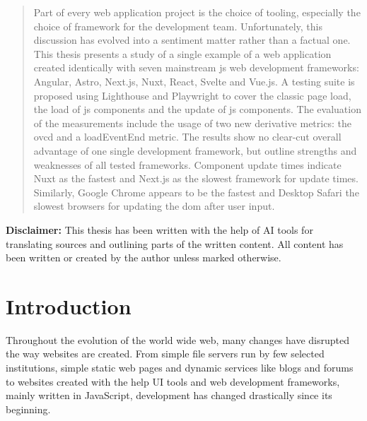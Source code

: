 \documentclass[a4paper, 12pt]{article}
\providecommand{\keywords}[1]
{
  {
    \footnotesize
    \textit{\textbf{Keywords ---} #1}
  } 
}
\begin{document}
\begin{abstract}
  Part of every web application project is the choice of tooling, especially the choice of framework for the development team.
  Unfortunately, this discussion has evolved into a sentiment matter rather than a factual one.
  This thesis presents a study of a single example of a web application created identically with seven mainstream \acrlong{js} web development frameworks: Angular, Astro, Next.js, Nuxt, React, Svelte and Vue.js.
  A testing suite is proposed using Lighthouse and Playwright to cover the classic page load, the load of \acrlong{js} components and the update of \acrlong{js} components.
  The evaluation of the measurements include the usage of two new derivative metrics: the \acrfull{ovcd} and a loadEventEnd metric.
  The results show no clear-cut overall advantage of one single development framework, but outline strengths and weaknesses of all tested frameworks.
  Component update times indicate Nuxt as the fastest and Next.js as the slowest framework for update times.
  Similarly, Google Chrome appears to be the fastest and Desktop Safari the slowest browsers for updating the \acrshort{dom} after user input. 
\end{abstract}


\vfill

\noindent\textbf{Disclaimer:} This thesis has been written with the help of AI tools for translating sources and outlining parts of the written content.
All content has been written or created by the author unless marked otherwise.

\pagebreak

\tableofcontents
\pagebreak

\section{Introduction}\label{sec:introduction}
Throughout the evolution of the world wide web, many changes have disrupted the way websites are created.
From simple file servers run by few selected institutions, simple static web pages and dynamic services like blogs and forums to websites created with the help UI tools and web development frameworks, mainly written in JavaScript, development has changed drastically since its beginning.
\end{document}
